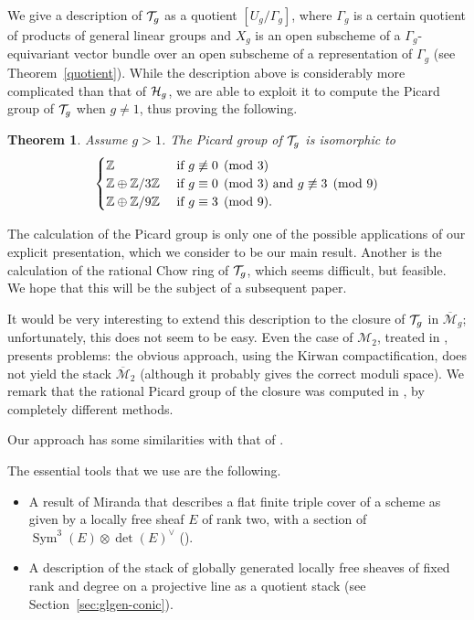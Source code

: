 \documentclass{amsart}
\numberwithin{equation}{section}
\numberwithin{subsection}{section}
\newtheorem{theorem}{Theorem}[section]
\theoremstyle{definition}
\theoremstyle{remark}
\newcommand\cM{\mathcal{M}} \newcommand\cN{\mathcal{N}}
\newcommand{\T}[1][g]{\cT_{#1}}
\newcommand{\sym}{\operatorname{Sym}}
\begin{document}
We give a description of $\T$ as a quotient $[U_{g}/\Gamma_{g}]$, where $\Gamma_{g}$ is a certain quotient of products of general linear groups and $X_{g}$ is an open subscheme of a $\Gamma_{g}$-equivariant vector bundle over an open subscheme of a representation of $\Gamma_{g}$ (see Theorem~\ref{quotient}). While the description above is considerably more complicated than that of $\mathcal{H}_{g}$, we are able to exploit it to compute the Picard group of $\T$ when $g \neq 1$, thus proving the following.

\begin{theorem}\label{thm:picard}
Assume $g >1$. The Picard group of $\T$ is isomorphic to
   \[
   \begin{cases}
   \mathbb{Z} & \text{ if $g \not\equiv 0 \pmod 3$}\\
   \mathbb{Z} \oplus \mathbb{Z}/3\mathbb{Z}
      &\text{ if $g \equiv 0 \pmod 3$ and $g \not\equiv 3 \pmod 9$}\\
   \mathbb{Z} \oplus \mathbb{Z}/9\mathbb{Z}
      &\text{ if $g \equiv 3 \pmod 9$.}\\   
   \end{cases}
   \]

\end{theorem}

The calculation of the Picard group is only one of the possible applications of our explicit presentation, which we consider to be our main result. Another is the calculation of the rational Chow ring of $\mathcal{T}_{g}$, which seems difficult, but feasible. We hope that this will be the subject of a subsequent paper.

It would be very interesting to extend this description to the closure of $\mathcal{T}_{g}$ in $\overline{\cM}_{g}$; unfortunately, this does not seem to be easy. Even the case of $\cM_{2}$, treated in \cite{vistoli98}, presents problems: the obvious approach, using the Kirwan compactification, does not yield the stack $\overline{\cM}_{2}$ (although it probably gives the correct moduli space). We remark that the rational Picard group of the closure was computed in \cite{stankova}, by completely different methods.

Our approach has some similarities with that of \cite{sb-trigonal}.

The essential tools that we use are the following.

\begin{itemize}

\item A result of Miranda that describes a flat finite triple cover of a scheme as given by a locally free sheaf $E$ of rank two, with a section of $\sym^{3}(E) \otimes \det(E)^{\vee}$ (\cite{mir3}).

\item A description of the stack of globally generated locally free sheaves of fixed rank and degree on a projective line as a quotient stack (see Section~\ref{sec:glgen-conic}).

\end{itemize}
\end{document}
